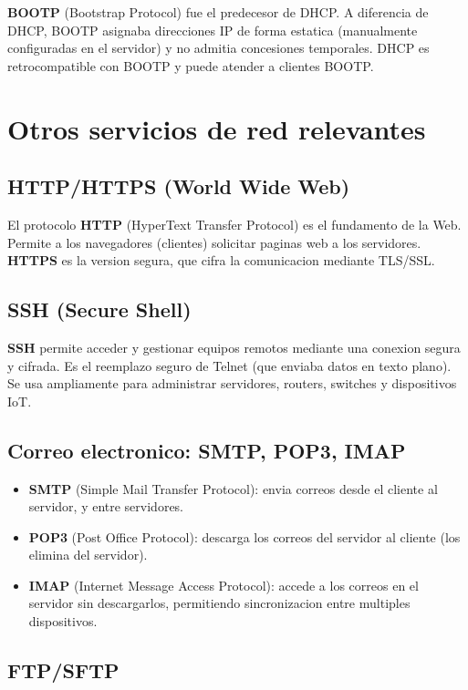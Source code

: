 \textbf{BOOTP} (Bootstrap Protocol) fue el predecesor de DHCP. A diferencia de
DHCP, BOOTP asignaba direcciones IP de forma estatica (manualmente
configuradas en el servidor) y no admitia concesiones temporales. DHCP es
retrocompatible con BOOTP y puede atender a clientes BOOTP.


\section{Otros servicios de red relevantes}

\subsection{HTTP/HTTPS (World Wide Web)}

El protocolo \textbf{HTTP} (HyperText Transfer Protocol) es el fundamento de la Web.
Permite a los navegadores (clientes) solicitar paginas web a los servidores.
\textbf{HTTPS} es la version segura, que cifra la comunicacion mediante TLS/SSL.

\subsection{SSH (Secure Shell)}

\textbf{SSH} permite acceder y gestionar equipos remotos mediante una conexion
segura y cifrada. Es el reemplazo seguro de Telnet (que enviaba datos en texto
plano). Se usa ampliamente para administrar servidores, routers, switches y
dispositivos IoT.

\subsection{Correo electronico: SMTP, POP3, IMAP}

\begin{itemize}
    \item \textbf{SMTP} (Simple Mail Transfer Protocol): envia correos desde el
    cliente al servidor, y entre servidores.
    \item \textbf{POP3} (Post Office Protocol): descarga los correos del servidor al
    cliente (los elimina del servidor).
    \item \textbf{IMAP} (Internet Message Access Protocol): accede a los correos en
    el servidor sin descargarlos, permitiendo sincronizacion entre multiples
    dispositivos.
\end{itemize}

\subsection{FTP/SFTP}

